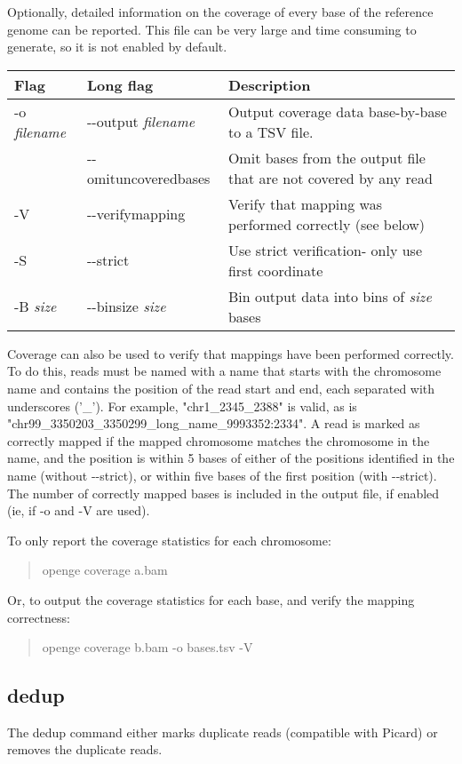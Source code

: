 \documentclass[11pt]{article}
\newcommand {\cmd}[1] {\begin{quote}#1\end{quote}}
\begin{document}
Optionally, detailed information on the coverage of every base of the reference genome can be reported. This file can be very large and time consuming to generate, so it is not enabled by default. 

\begin{center}
\begin{tabular}{llp{3.5in}}
\hline
Flag&Long flag&Description\\ \hline
-o  \textit{filename}&{-}{-}output \textit{filename}&Output coverage data base-by-base to a TSV file.\\
&{-}{-}omituncoveredbases&Omit bases from the output file that are not covered by any read\\
-V&{-}{-}verifymapping&Verify that mapping was performed correctly (see below)\\
-S&{-}{-}strict&Use strict verification- only use first coordinate\\
-B \textit{size}&{-}{-}binsize \textit{size}&Bin output data into bins of \textit{size} bases\\
\end{tabular}
\end{center}

Coverage can also be used to verify that mappings have been performed correctly. To do this, reads must be named with a name that starts with the chromosome name and contains the position of the read start and end, each separated with underscores ('\_'). For example, "chr1\_2345\_2388" is valid, as is "chr99\_3350203\_3350299\_long\_name\_9993352:2334". A read is marked as correctly mapped if the mapped chromosome matches the chromosome in the name, and the position is within 5 bases of either of the positions identified in the name (without {-}{-}strict), or within five bases of the first position (with {-}{-}strict). The number of correctly mapped bases is included in the output file, if enabled (ie, if -o and -V are used).

To only report the coverage statistics for each chromosome:
\cmd{openge coverage a.bam}

Or, to output the coverage statistics for each base, and verify the mapping correctness:
\cmd{openge coverage b.bam -o bases.tsv -V}

\subsection {dedup}
The dedup command either marks duplicate reads (compatible with Picard) or removes the duplicate reads. 
\end{document}
